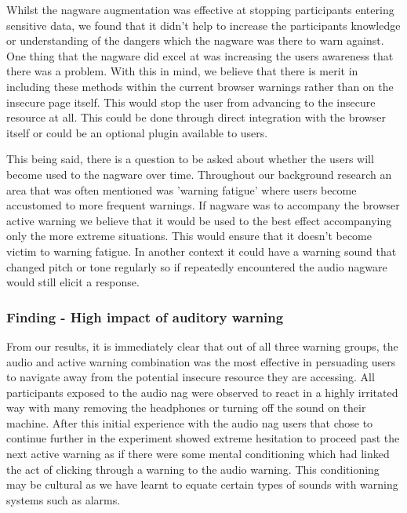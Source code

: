 \documentclass{mpaper}
\begin{document}


Whilst the nagware augmentation was effective at stopping participants entering sensitive data, we found that it didn't help to increase the participants knowledge or understanding of the dangers which the nagware was there to warn against. One thing that the nagware did excel at was increasing the users awareness that there was a problem. With this in mind, we believe that there is merit in including these methods within the current browser warnings rather than on the insecure page itself. This would stop the user from advancing to the insecure resource at all. This could be done through direct integration with the browser itself or could be an optional plugin available to users.

This being said, there is a question to be asked about whether the users will become used to the nagware over time. Throughout our background research\cite{WarningLand} an area that was often mentioned was 'warning fatigue' where users become accustomed to more frequent warnings. If nagware was to accompany the browser active warning we believe that it would be used to the best effect accompanying only the more extreme situations. This would ensure that it doesn't become victim to warning fatigue. In another context it could have a warning sound that changed pitch or tone regularly so if repeatedly encountered the audio nagware would still elicit a response.

\subsubsection{Finding - High impact of auditory warning}%

From our results, it is immediately clear that out of all three warning groups, the audio and active warning combination was the most effective in persuading users to navigate away from the potential insecure resource they are accessing. All participants exposed to the audio nag were observed to react in a highly irritated way with many removing the headphones or turning off the sound on their machine. After this initial experience with the audio nag users that chose to continue further in the experiment showed extreme hesitation to proceed past the next active warning as if there were some mental conditioning which had linked the act of clicking through a warning to the audio warning. This conditioning may be cultural as we have learnt to equate certain types of sounds with warning systems such as alarms. 
\end{document}
